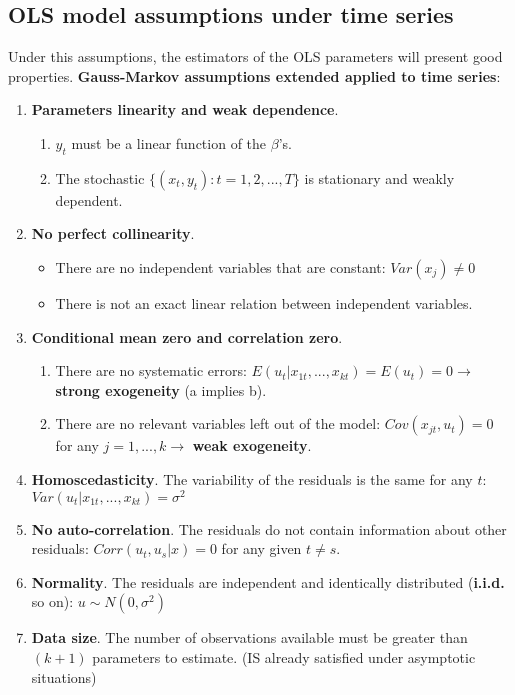 \documentclass[10pt, a4paper, landscape]{extarticle}
\begin{document}
\begin{multicols}{3}
	\subsection*{OLS model assumptions under time series}
		Under this assumptions, the estimators of the OLS parameters will present good properties. \textbf{Gauss-Markov assumptions extended applied to time series}:
		\begin{enumerate}[leftmargin=*, label=ts\arabic*.]
			\item \textbf{Parameters linearity and weak dependence}.
			\begin{enumerate}[leftmargin=*, label=\alph*.]
				\item $y_t$ must be a linear function of the $\beta$'s.
				\item The stochastic $\lbrace(x_t, y_t): t = 1, 2, ..., T\rbrace$ is stationary and weakly dependent.
			\end{enumerate} 
			\item \textbf{No perfect collinearity}.
			\begin{itemize}[leftmargin=*]
				\item There are no independent variables that are constant: $Var(x_j) \neq 0$
				\item There is not an exact linear relation between independent variables.
			\end{itemize}
			\item \textbf{Conditional mean zero and correlation zero}.
			\begin{enumerate}[leftmargin=*, label=\alph*.]
				\item There are no systematic errors: $E(u_t | x_{1t}, ..., x_{kt}) = E(u_t) = 0 \rightarrow$ \textbf{strong exogeneity} (a implies b).
				\item There are no relevant variables left out of the model: $Cov(x_{jt} , u_t) = 0$ for any $j = 1, ..., k \rightarrow$ \textbf{weak exogeneity}.
			\end{enumerate}
			\item \textbf{Homoscedasticity}. The variability of the residuals is the same for any $t$: $Var(u_t | x_{1t}, ..., x_{kt}) = \sigma^2$
			\item \textbf{No auto-correlation}. The residuals do not contain information about other residuals: $Corr(u_t, u_s | x) = 0$ for any given $t \neq s$.
			\item \textbf{Normality}. The residuals are independent and identically distributed (\textbf{i.i.d.} so on): $u \sim N(0,\sigma^2)$
			\item \textbf{Data size}. The number of observations available must be greater than $(k + 1)$ parameters to estimate. (IS already satisfied under asymptotic situations)
		\end{enumerate}	

\end{multicols}
\end{document}
